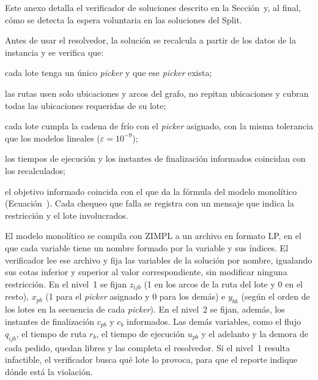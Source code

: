 \startchapter[title={Verificación de las soluciones}, reference=Anexo_Verificacion]

Este anexo detalla el verificador de soluciones descrito en la
Sección~ y, al final, cómo se detecta la espera
voluntaria en las soluciones del Split.

\startsection[title={Chequeos directos}]

Antes de usar el resolvedor, la solución se recalcula a partir de los datos
de la instancia y se verifica que:
\startitemize
	\item cada lote tenga un único {\em picker} y que ese {\em picker}
	exista;
	\item las rutas usen solo ubicaciones y arcos del grafo, no repitan
	ubicaciones y cubran todas las ubicaciones requeridas de su lote;
	\item cada lote cumpla la cadena de frío con el {\em picker} asignado,
	con la misma tolerancia que los modelos lineales ($\varepsilon = 10^{-9}$);
	\item los tiempos de ejecución y los instantes de finalización informados
	coincidan con los recalculados;
	\item el objetivo informado coincida con el que da la fórmula del modelo
	monolítico (Ecuación~).
\stopitemize
Cada chequeo que falla se registra con un mensaje que indica la restricción y
el lote involucrados.

\stopsection

\startsection[title={Cómo se fija una solución en el modelo}]

El modelo monolítico se compila con ZIMPL a un archivo en formato LP, en el
que cada variable tiene un nombre formado por la variable y sus índices. El
verificador lee ese archivo y fija las variables de la solución por nombre,
igualando sus cotas inferior y superior al valor correspondiente, sin
modificar ninguna restricción. En el nivel~1 se fijan $z_{ijb}$ (1 en los
arcos de la ruta del lote y 0 en el resto), $x_{pb}$ (1 para el
{\em picker} asignado y 0 para los demás) e $y_{bk}$ (según el orden de los
lotes en la secuencia de cada {\em picker}). En el nivel~2 se fijan, además,
los instantes de finalización $c_{pb}$ y $c_b$ informados. Las demás
variables, como el flujo $q_{ijb}$, el tiempo de ruta $r_b$, el tiempo de
ejecución $u_{pb}$ y el adelanto y la demora de cada pedido, quedan libres y
las completa el resolvedor. Si el nivel~1 resulta infactible, el verificador
busca qué lote lo provoca, para que el reporte indique dónde está la
violación.

